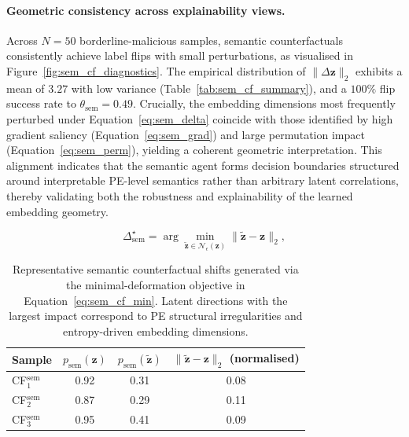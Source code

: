\documentclass[3p]{elsarticle}
\begin{document}
\paragraph{Geometric consistency across explainability views.}
Across $N=50$ borderline-malicious samples, semantic counterfactuals consistently achieve label flips with small perturbations, as visualised in
Figure~\ref{fig:sem_cf_diagnostics}. The empirical distribution of $\lVert \Delta \mathbf{z} \rVert_2$ exhibits a mean of $3.27$ with low variance (Table~\ref{tab:sem_cf_summary}), and a $100\%$ flip success rate to
$\theta_{\mathrm{sem}}=0.49$. Crucially, the embedding dimensions most frequently perturbed under Equation~\eqref{eq:sem_delta} coincide with those identified by high gradient saliency (Equation~\eqref{eq:sem_grad}) and large permutation impact (Equation~\eqref{eq:sem_perm}), yielding a coherent geometric interpretation. This alignment indicates that the semantic agent forms decision boundaries structured around interpretable PE-level semantics rather than arbitrary latent correlations, thereby validating both the robustness and explainability of the learned embedding geometry.



\begin{equation}
\Delta^{\star}_{\mathrm{sem}}
=
\arg\min_{\tilde{\mathbf{z}} \in \mathcal{N}_{\epsilon}(\mathbf{z})}
\|\tilde{\mathbf{z}} - \mathbf{z}\|_2 ,
\label{eq:sem_cf_min}
\end{equation}

\begin{table}[t]
\centering

\begin{tabular}{lccc}
\toprule
\textbf{Sample} &
$p_{\mathrm{sem}}(\mathbf{z})$ &
$p_{\mathrm{sem}}(\tilde{\mathbf{z}})$ &
$\|\tilde{\mathbf{z}}-\mathbf{z}\|_2$ (normalised) \\
\midrule
CF$^\mathrm{sem}_1$ & 0.92 & 0.31 & 0.08 \\
CF$^\mathrm{sem}_2$ & 0.87 & 0.29 & 0.11 \\
CF$^\mathrm{sem}_3$ & 0.95 & 0.41 & 0.09 \\
\bottomrule
\end{tabular}
\caption{Representative semantic counterfactual shifts generated via the minimal-deformation objective in Equation~\eqref{eq:sem_cf_min}. Latent directions with the largest impact correspond to PE structural irregularities and entropy-driven embedding dimensions.}
\label{tab:sem_cf}
\end{table}
\end{document}
